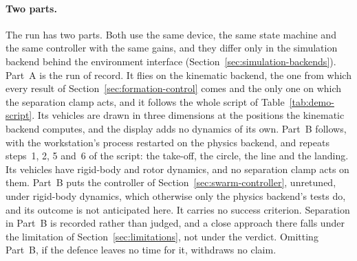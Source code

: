 \paragraph{Two parts.} The run has two parts. Both use the same device, the same state machine and
the same controller with the same gains, and they differ only in the simulation backend behind the
environment interface (Section~\ref{sec:simulation-backends}). Part~A is the run of record. It flies
on the kinematic backend, the one from which every result of Section~\ref{sec:formation-control}
comes and the only one on which the separation clamp acts, and it follows the whole script of
Table~\ref{tab:demo-script}. Its vehicles are drawn in three dimensions at the positions the
kinematic backend computes, and the display adds no dynamics of its own. Part~B follows, with the
workstation's process restarted on the physics backend, and repeats steps~1, 2, 5 and~6 of the
script: the take-off, the circle, the line and the landing. Its vehicles have rigid-body and rotor
dynamics, and no separation clamp acts on them. Part~B puts the controller of
Section~\ref{sec:swarm-controller}, unretuned, under rigid-body dynamics, which otherwise only the
physics backend's tests do, and its outcome is not anticipated here. It carries no success
criterion. Separation in Part~B is
recorded rather than judged, and a close approach there falls under the limitation of
Section~\ref{sec:limitations}, not under the verdict. Omitting Part~B, if the defence leaves no time
for it, withdraws no claim.

